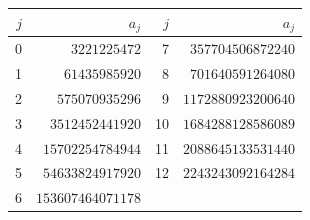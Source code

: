 \begin{center}
\tiny
\begin{tabular}{@{}r r@{\qquad}r r@{}}
\toprule
$j$ & $a_j$ & $j$ & $a_j$ \\
\midrule
0 & $3221225472$ & 7 & $357704506872240$ \\
1 & $61435985920$ & 8 & $701640591264080$ \\
2 & $575070935296$ & 9 & $1172880923200640$ \\
3 & $3512452441920$ & 10 & $1684288128586089$ \\
4 & $15702254784944$ & 11 & $2088645133531440$ \\
5 & $54633824917920$ & 12 & $2243243092164284$ \\
6 & $153607464071178$ & & \\
\bottomrule
\end{tabular}
\end{center}

